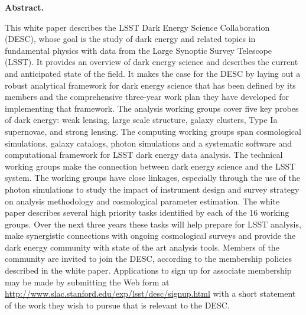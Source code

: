 \begin{center}

\vspace*{30mm}

{\bf Abstract.} 

This white paper describes the LSST Dark Energy Science Collaboration (DESC), whose goal is the study of dark energy and related topics in fundamental physics with data from the Large Synoptic Survey Telescope (LSST).  
It provides an overview of dark energy science and describes the current and anticipated state of the field.  
It makes the case for the DESC by laying out a robust analytical framework for dark energy science that has been defined by its members and the comprehensive three-year work plan they have developed for implementing that framework.  
The analysis working groups cover five key probes of dark energy: weak lensing, large scale structure, galaxy clusters, Type Ia supernovae, and strong lensing. 
The computing working groups span cosmological simulations, galaxy catalogs, photon simulations and a systematic software and computational framework for LSST dark energy data analysis. 
The technical working groups make the connection between dark energy science and the LSST system. 
The working groups have close linkages, especially through the use of the photon simulations to study the impact of instrument design and survey strategy on analysis methodology and cosmological parameter estimation. 
The white paper describes several high priority tasks identified by each of the 16 working groups. 
Over the next three years these tasks will help prepare for LSST analysis, make synergistic connections with ongoing cosmological surveys and provide the dark energy community with state of the art analysis tools. 
Members of the community are invited to join the DESC, according to the membership policies described in the white paper.
Applications to sign up for associate membership may be made by submitting the Web form at
\url{http://www.slac.stanford.edu/exp/lsst/desc/signup.html}
with a short statement of the work they wish to pursue that is relevant to the DESC.


\end{center}

